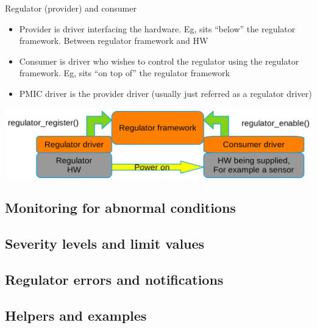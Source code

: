 \documentclass[10pt]{beamer}
\begin{document}

\begin{frame}[t]{Regulator (provider) and consumer}\vspace{4pt}


\begin{itemize}
	\item Provider is driver interfacing the hardware. Eg, sits “below” the regulator framework. Between regulator framework and HW
	\item Consumer is driver who wishes to control the regulator using the regulator framework. Eg, sits “on top of” the regulator framework
	\item PMIC driver is the provider driver (usually just referred as a regulator driver) \\[10pt]
\end{itemize}
\includegraphics[width=1\linewidth]{img/regulator_users.png}
\end{frame}


\addtocounter{framenumber}{-1}
\begin{frame}[plain]
\section{Monitoring for abnormal conditions}
\subsection{Severity levels and limit values}
\subsection{Regulator errors and notifications}
\subsection{Helpers and examples}
\end{frame}
\end{document}
